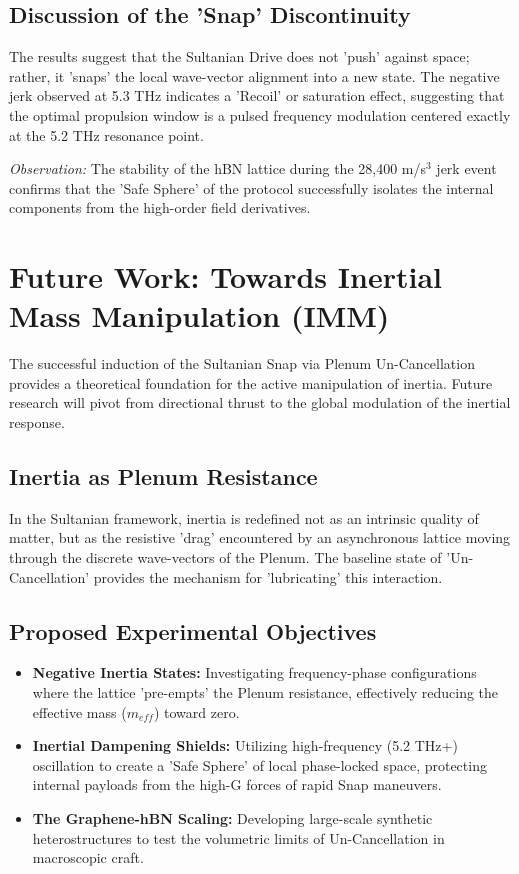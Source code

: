 \documentclass[11pt]{article}
\begin{document}
\subsection{Discussion of the 'Snap' Discontinuity}
The results suggest that the Sultanian Drive does not 'push' against space; rather, it 'snaps' the local wave-vector alignment into a new state. The negative jerk observed at 5.3 THz indicates a 'Recoil' or saturation effect, suggesting that the optimal propulsion window is a pulsed frequency modulation centered exactly at the 5.2 THz resonance point.

\textit{Observation:} The stability of the hBN lattice during the 28,400 m/s$^3$ jerk event confirms that the 'Safe Sphere' of the protocol successfully isolates the internal components from the high-order field derivatives.
\section{Future Work: Towards Inertial Mass Manipulation (IMM)}

The successful induction of the Sultanian Snap via Plenum Un-Cancellation provides a theoretical foundation for the active manipulation of inertia. Future research will pivot from directional thrust to the global modulation of the inertial response.

\subsection{Inertia as Plenum Resistance}
In the Sultanian framework, inertia is redefined not as an intrinsic quality of matter, but as the resistive 'drag' encountered by an asynchronous lattice moving through the discrete wave-vectors of the Plenum. The baseline state of 'Un-Cancellation' provides the mechanism for 'lubricating' this interaction.

\subsection{Proposed Experimental Objectives}
\begin{itemize}
    \item \textbf{Negative Inertia States:} Investigating frequency-phase configurations where the lattice 'pre-empts' the Plenum resistance, effectively reducing the effective mass ($m_{eff}$) toward zero.
    \item \textbf{Inertial Dampening Shields:} Utilizing high-frequency (5.2 THz+) oscillation to create a 'Safe Sphere' of local phase-locked space, protecting internal payloads from the high-G forces of rapid Snap maneuvers.
    \item \textbf{The Graphene-hBN Scaling:} Developing large-scale synthetic heterostructures to test the volumetric limits of Un-Cancellation in macroscopic craft.
\end{itemize}
\end{document}
